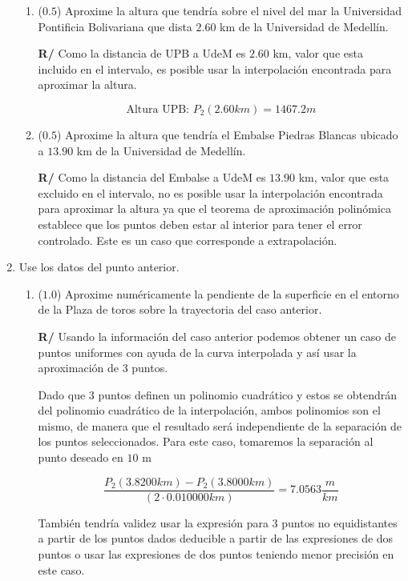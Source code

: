 \documentclass[12pt]{article}
\begin{document}
\begin{enumerate}[leftmargin=*,widest=9]
\begin{enumerate}[label=\alph*]
    \item (\(0.5\)) Aproxime la altura que tendría sobre el nivel del mar la Universidad Pontificia Bolivariana que dista \(2.60\) km de la Universidad de Medellín. %

\textbf{R/} Como la distancia de UPB a UdeM es \(2.60\) km, valor que esta incluido en el intervalo, es posible usar la interpolación encontrada para aproximar la altura.

\[ \text{Altura UPB: } P_2(2.60km) = 1467.2 m \]

    \item (\(0.5\)) Aproxime la altura que tendría el Embalse Piedras Blancas ubicado a \(13.90\) km de la Universidad de Medellín. %

\textbf{R/} Como la distancia del Embalse a UdeM es \(13.90\) km, valor que esta excluido en el intervalo, no es posible usar la interpolación encontrada para aproximar la altura ya que el teorema de aproximación polinómica establece que los puntos deben estar al interior para tener el error controlado. Este es un caso que corresponde a extrapolación. %

\end{enumerate}
   \item Use los datos del punto anterior.

   \begin{enumerate}[label=\alph*]
   \item (\(1.0\)) Aproxime numéricamente la pendiente de la superficie en el entorno de la Plaza de toros sobre la trayectoria del caso anterior.

\textbf{R/} Usando la información del caso anterior podemos obtener un caso de puntos uniformes con ayuda de la curva interpolada y así usar la aproximación de 3 puntos.

Dado que 3 puntos definen un polinomio cuadrático y estos se obtendrán del polinomio cuadrático de la interpolación, ambos polinomios son el mismo, de manera que el resultado será independiente de la separación de los puntos seleccionados. Para este caso, tomaremos la separación al punto deseado en \(10\) m

\[ \frac{P_2(3.8200 km) - P_2(3.8000 km)}{(2 \cdot 0.010000 km)} = 7.0563 \frac{m}{km}\]

También tendría validez usar la expresión para 3 puntos no equidistantes a partir de los puntos dados deducible a partir de las expresiones de dos puntos o usar las expresiones de dos puntos teniendo menor precisión en este caso.


\end{enumerate}
\end{enumerate}
\end{document}
